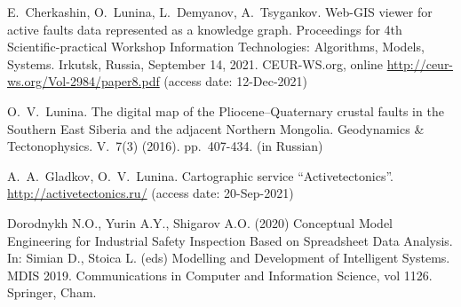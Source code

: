 \documentclass[
]{ceurart}
\begin{document}
\begin{thebibliography}{99}
 E.~Cherkashin, O.~Lunina, L.~Demyanov, A.~Tsygankov. Web-GIS viewer for active faults data represented as a knowledge graph.  Proceedings for 4th Scientific-practical Workshop Information Technologies: Algorithms, Models, Systems. Irkutsk, Russia, September 14, 2021. CEUR-WS.org, online \url{http://ceur-ws.org/Vol-2984/paper8.pdf} (access date: 12-Dec-2021)

 O.~V.~Lunina.  The digital map of the Pliocene–Quaternary crustal faults in the Southern East Siberia and the adjacent Northern Mongolia.  Geodynamics \& Tectonophysics.  V.~7(3) (2016).  pp.~407-434. (in Russian) 

 A.~A.~Gladkov, O.~V.~Lunina. Cartographic service ``Activetectonics''. \url{http://activetectonics.ru/} (access date: 20-Sep-2021)

 Dorodnykh N.O., Yurin A.Y., Shigarov A.O. (2020) Conceptual Model Engineering for Industrial Safety Inspection Based on Spreadsheet Data Analysis.  In: Simian D., Stoica L. (eds) Modelling and Development of Intelligent Systems.  MDIS 2019.  Communications in Computer and Information Science, vol 1126.  Springer, Cham. 







\end{thebibliography}

\end{document}
